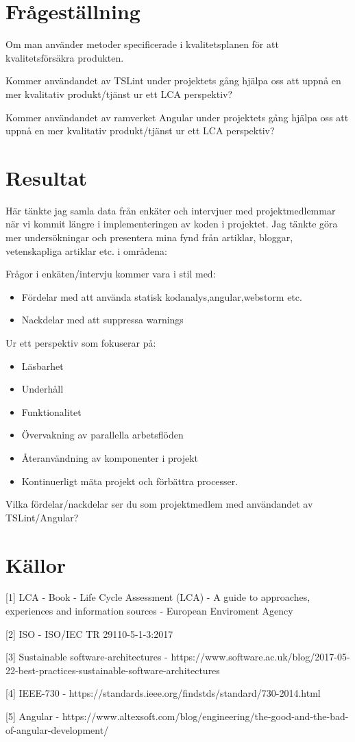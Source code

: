 \section{Frågeställning}

Om man använder metoder specificerade i kvalitetsplanen för att kvalitetsförsäkra produkten. 

Kommer användandet av TSLint under projektets gång hjälpa oss att uppnå en mer kvalitativ produkt/tjänst ur ett LCA perspektiv?

Kommer användandet av ramverket Angular under projektets gång hjälpa oss att uppnå en mer kvalitativ produkt/tjänst ur ett LCA perspektiv?

\section{Resultat}
Här tänkte jag samla data från enkäter och intervjuer med projektmedlemmar när vi kommit längre i implementeringen av koden i projektet.
Jag tänkte göra mer undersökningar och presentera mina fynd från artiklar, bloggar, vetenskapliga artiklar etc. i områdena: 

Frågor i enkäten/intervju kommer vara i stil med:


\begin{itemize}
	\item Fördelar med att använda statisk kodanalys,angular,webstorm etc. 
	\item Nackdelar med att suppressa warnings 
\end{itemize}

Ur ett perspektiv som fokuserar på: 
\begin{itemize}
	\item Läsbarhet 
	\item Underhåll
	\item Funktionalitet
	\item Övervakning av parallella arbetsflöden
	\item Återanvändning av komponenter i projekt
	\item Kontinuerligt mäta projekt och förbättra processer.
\end{itemize}

Vilka fördelar/nackdelar ser du som projektmedlem med användandet av TSLint/Angular?



\section{Källor}

[1] LCA - Book - Life Cycle Assessment (LCA) - A guide to approaches, experiences and information sources - European Enviroment Agency 

[2] ISO - ISO/IEC TR 29110-5-1-3:2017 

[3] Sustainable software-architectures -  https://www.software.ac.uk/blog/2017-05-22-best-practices-sustainable-software-architectures 

[4] IEEE-730 - https://standards.ieee.org/findstds/standard/730-2014.html 

[5] Angular - https://www.altexsoft.com/blog/engineering/the-good-and-the-bad-of-angular-development/ 

